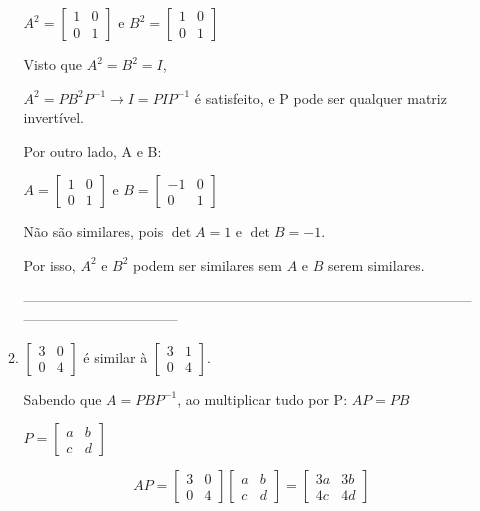 \documentclass[leqno]{article}
\numberwithin{equation}{section}
\begin{document}
\begin{enumerate}
\begin{enumerate}
			$A^2 = \begin{bmatrix}
				1 & 0 \\
				0 & 1
			\end{bmatrix}$ e $B^2 = \begin{bmatrix}
				1 & 0 \\
				0 & 1
			\end{bmatrix}$
		
			Visto que $A^2 = B^2 = I$, 
			
			$A^2 = PB^2P^{-1} \longrightarrow I = PIP^{-1}$  é satisfeito, e P pode ser qualquer matriz invertível.
			
			Por outro lado, A e B:
			
			$A = \begin{bmatrix}
				1 & 0 \\
				0 & 1
			\end{bmatrix}$ e $B = \begin{bmatrix}
				-1 & 0 \\
				0 & 1
			\end{bmatrix}$
			
			Não são similares, pois $\det{A} = 1$ e $\det{B} = -1$.
			
			Por isso, $A^2$ e $B^2$ podem ser similares sem $A$ e $B$ serem similares.
			
			---------------------------------------------------------------------------------------------------------------------------------
			
			\item $\begin{bmatrix}
				3 & 0 \\
				0 & 4
			\end{bmatrix}$ é similar à $\begin{bmatrix}
				3 & 1 \\
				0 & 4
			\end{bmatrix}$.
		
			\begin{sol} 
				Sabendo que $A = PBP^{-1}$, ao multiplicar tudo por P: $AP = PB$
				
				$P = \begin{bmatrix}
					a & b \\
					c & d
				\end{bmatrix}$			
				
				$$AP = \begin{bmatrix}
					3 & 0 \\
					0 & 4
				\end{bmatrix}\begin{bmatrix}
					a & b \\
					c & d
				\end{bmatrix} = \begin{bmatrix}
					3a & 3b \\
					4c & 4d
				\end{bmatrix}$$ 
			

\end{sol}
\end{enumerate}
\end{enumerate}
\end{document}
